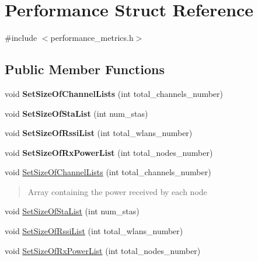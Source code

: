 \hypertarget{structPerformance}{}\section{Performance Struct Reference}
\label{structPerformance}


{\ttfamily \#include $<$performance\+\_\+metrics.\+h$>$}

\subsection*{Public Member Functions}
\begin{DoxyCompactItemize}
\item 
\mbox{\label{structPerformance_a4f671d1de3d10b181cf308b66805da58}} 
void {\bfseries Set\+Size\+Of\+Channel\+Lists} (int total\+\_\+channels\+\_\+number)
\item 
\mbox{\label{structPerformance_af6b92719f1a286afe9973304b8ecf445}} 
void {\bfseries Set\+Size\+Of\+Sta\+List} (int num\+\_\+stas)
\item 
\mbox{\label{structPerformance_afed78fdc35bd07dd576a5235389f15ed}} 
void {\bfseries Set\+Size\+Of\+Rssi\+List} (int total\+\_\+wlans\+\_\+number)
\item 
\mbox{\label{structPerformance_a4478d24cc24761d24a8bb0d628c8664e}} 
void {\bfseries Set\+Size\+Of\+Rx\+Power\+List} (int total\+\_\+nodes\+\_\+number)
\item 
void \hyperlink{structPerformance_a4f671d1de3d10b181cf308b66805da58}{Set\+Size\+Of\+Channel\+Lists} (int total\+\_\+channels\+\_\+number)
\begin{DoxyCompactList}\small\item\em \begin{quote}
Array containing the power received by each node \end{quote}
\end{DoxyCompactList}\item 
void \hyperlink{structPerformance_af6b92719f1a286afe9973304b8ecf445}{Set\+Size\+Of\+Sta\+List} (int num\+\_\+stas)
\item 
void \hyperlink{structPerformance_afed78fdc35bd07dd576a5235389f15ed}{Set\+Size\+Of\+Rssi\+List} (int total\+\_\+wlans\+\_\+number)
\item 
void \hyperlink{structPerformance_a4478d24cc24761d24a8bb0d628c8664e}{Set\+Size\+Of\+Rx\+Power\+List} (int total\+\_\+nodes\+\_\+number)
\end{DoxyCompactItemize}
